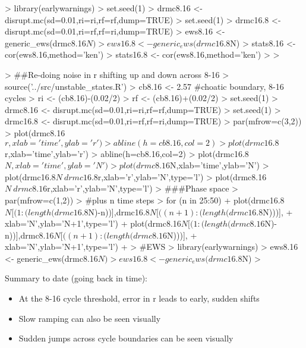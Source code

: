 \documentclass[12pt]{article}
\begin{document}
\begin{Schunk}
\begin{Sinput}
> library(earlywarnings)
> set.seed(1)
> drmc8.16 <- disrupt.mc(sd=0.01,ri=ri,rf=rf,dump=TRUE)
> set.seed(1)
> drmc16.8 <- disrupt.mc(sd=0.01,ri=rf,rf=ri,dump=TRUE)
> ews8.16 <- generic_ews(drmc8.16$N)
> ews16.8 <- generic_ews(drmc16.8$N)
> stats8.16 <- cor(ews8.16,method='ken')
> stats16.8 <- cor(ews8.16,method='ken')
> 
> 
\end{Sinput}
\end{Schunk}

\begin{Schunk}
\begin{Sinput}
>   ##Re-doing noise in r shifting up and down across 8-16
> source('../src/unstable_states.R')
> cb8.16 <- 2.57 #choatic boundary, 8-16 cycles
> ri <- (cb8.16)-(0.02/2)
> rf <- (cb8.16)+(0.02/2)
> set.seed(1)
> drmc8.16 <- disrupt.mc(sd=0.01,ri=ri,rf=rf,dump=TRUE)
> set.seed(1)
> drmc16.8 <- disrupt.mc(sd=0.01,ri=rf,rf=ri,dump=TRUE)
> par(mfrow=c(3,2))
> plot(drmc8.16$r,xlab='time',ylab='r')
> abline(h=cb8.16,col=2)
> plot(drmc16.8$r,xlab='time',ylab='r')
> abline(h=cb8.16,col=2)
> plot(drmc16.8$N,xlab='time',ylab='N')
> plot(drmc8.16$N,xlab='time',ylab='N')
> plot(drmc16.8$N~drmc16.8$r,xlab='r',ylab='N',type='l')
> plot(drmc8.16$N~drmc8.16$r,xlab='r',ylab='N',type='l')
> ###Phase space
> par(mfrow=c(1,2))
>                                         #plus n time steps
> for (n in 25:50){
+   plot(drmc16.8$N[(1:(length(drmc16.8$N)-n))],drmc16.8$N[((n+1):(length(drmc16.8$N)))],
+        xlab='N',ylab='N+1',type='l')
+   plot(drmc8.16$N[(1:(length(drmc8.16$N)-n))],drmc8.16$N[((n+1):(length(drmc8.16$N)))],
+        xlab='N',ylab='N+1',type='l')
+ }
> #EWS
> library(earlywarnings)
> ews8.16 <- generic_ews(drmc8.16$N)
> ews16.8 <- generic_ews(drmc16.8$N)
> 
\end{Sinput}
\end{Schunk}

Summary to date (going back in time):

\begin{itemize}
\item At the 8-16 cycle threshold, error in r leads to early, sudden shifts
\item Slow ramping can also be seen visually
\item Sudden jumps across cycle boundaries can be seen visually
\end{itemize}



\end{document}
